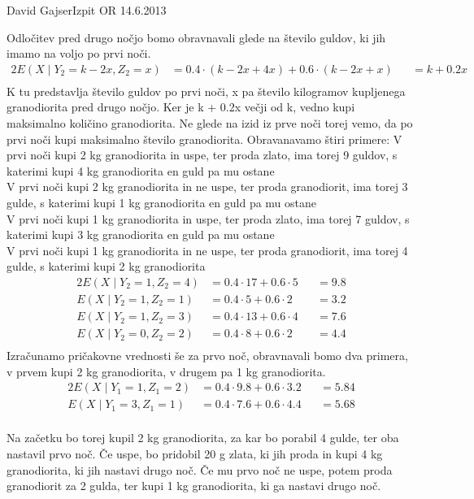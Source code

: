 \begin{naloga}{David Gajser}{Izpit OR 14.6.2013}
\begin{odgovor}
Odločitev pred drugo nočjo bomo obravnavali glede na število guldov, ki jih imamo na voljo po prvi noči.
\begin{alignat*}{2}
E(X \mid  Y_2 = k-2x, Z_2 = x) &= 0.4 \cdot (k - 2x + 4x) + 0.6 \cdot (k - 2x + x) &&= k + 0.2x \\
\end{alignat*}
K tu predstavlja število guldov po prvi noči, x pa število kilogramov kupljenega granodiorita pred drugo nočjo. Ker je k + 0.2x večji od k, vedno kupi maksimalno količino granodiorita.
Ne glede na izid iz prve noči torej vemo, da po prvi noči kupi maksimalno število granodiorita.
Obravanavamo štiri primere: 
V prvi noči kupi 2 kg granodiorita in uspe, ter proda zlato, ima torej 9 guldov, s katerimi kupi 4 kg granodiorita en guld pa mu ostane\\
V prvi noči kupi 2 kg granodiorita in ne uspe, ter proda granodiorit, ima torej 3 gulde, s katerimi kupi 1 kg granodiorita en guld pa mu ostane\\
V prvi noči kupi 1 kg granodiorita in uspe, ter proda zlato, ima torej 7 guldov, s katerimi kupi 3 kg granodiorita en guld pa mu ostane\\
V prvi noči kupi 1 kg granodiorita in ne uspe, ter proda granodiorit, ima torej 4 gulde, s katerimi kupi 2 kg granodiorita\\

\begin{alignat*}{2}
E(X \mid  Y_2 = 1, Z_2 = 4) &= 0.4 \cdot 17 + 0.6 \cdot 5 &&= 9.8 \\
E(X \mid  Y_2 = 1, Z_2 = 1) &= 0.4 \cdot 5 + 0.6 \cdot 2 &&= 3.2 \\
E(X \mid  Y_2 = 1, Z_2 = 3) &= 0.4 \cdot 13 + 0.6 \cdot 4 &&= 7.6 \\
E(X \mid  Y_2 = 0, Z_2 = 2) &= 0.4 \cdot 8 + 0.6 \cdot 2 &&= 4.4 \\
\end{alignat*}
Izračunamo pričakovne vrednosti še za prvo noč, obravnavali bomo dva primera, v prvem kupi 2 kg granodiorita, v drugem pa 1 kg granodiorita.
\begin{alignat*}{2}
E(X \mid  Y_1 = 1, Z_1 = 2) &= 0.4 \cdot 9.8 + 0.6 \cdot 3.2 &&= 5.84 \\
E(X \mid  Y_1 = 3, Z_1 = 1) &= 0.4 \cdot 7.6 + 0.6 \cdot 4.4 &&= 5.68 \\
\end{alignat*}

Na začetku bo torej kupil 2 kg granodiorita, za kar bo porabil 4 gulde, ter oba nastavil prvo noč. Če uspe, bo pridobil 20 g zlata, ki 
jih proda in kupi 4 kg granodiorita, ki jih nastavi drugo noč.
Če mu prvo noč ne uspe, potem proda granodiorit za 2 gulda, ter kupi 1 kg granodiorita, ki ga nastavi drugo noč.

\begin{slika}
\makebox[\textwidth][c]{
\pgfslika
}
\end{slika}
\end{odgovor}
\end{naloga}
